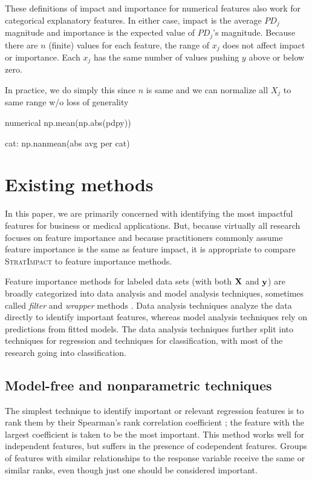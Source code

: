\documentclass[11pt]{article}
\newcommand{\todo}[1]{{{\small\color{red}{[#1]}}}}
\newcommand{\simp}{\fontfamily{cmr}\textsc{\small StratImpact}}
\begin{document}
\todo{categorical impact is also expected value.}

These definitions of impact and importance for numerical features also work for categorical explanatory features. In either case, impact is the average $PD_j$ magnitude and importance is the expected value of $PD_j$'s magnitude. Because there are $n$ (finite) values for each feature, the range of $x_j$ does not affect impact or importance. Each $x_j$ has the same number of values pushing $y$ above or below zero.

In practice, we do simply this since $n$ is same and we can normalize all $X_j$ to same range w/o loss of generality

numerical np.mean(np.abs(pdpy))

cat: np.nanmean(abs avg per cat)



\section{Existing methods}\label{sec:existing}

In this paper, we are primarily concerned with identifying the most impactful features for business or medical applications. But, because virtually all research focuses on feature importance and because practitioners commonly assume feature importance is the same as feature impact, it is appropriate to compare \simp{} to  feature importance methods.

Feature importance methods for labeled data sets (with both $\bf X$ and $\bf y$) are broadly categorized into data analysis and model analysis techniques, sometimes called {\em filter} and {\em wrapper} methods \citep{tsanas}. Data analysis techniques analyze the data directly to identify important features, whereas model analysis techniques rely on predictions from fitted models.  The data analysis techniques further split into techniques for regression and techniques for classification, with most of the research going into classification.

\subsection{Model-free and nonparametric techniques}

The simplest technique to identify important or relevant regression features is to rank them by their Spearman's rank correlation coefficient \citep{spearmans}; the feature with the largest coefficient is taken to be the most important. This method works well for independent features, but suffers in the presence of codependent features.   Groups of features with similar relationships to the response variable receive the same or similar ranks, even though just one should be considered important.
\end{document}
